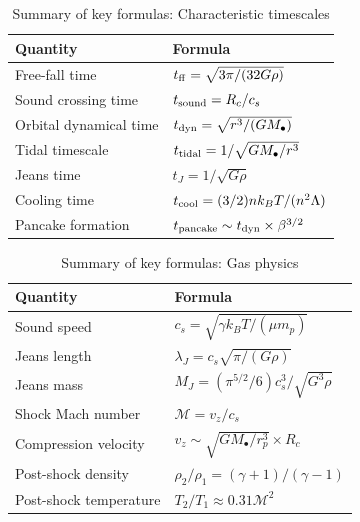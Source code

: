 \documentclass[twocolumn,amsmath,amssymb,prd,superscriptaddress,nofootinbib]{revtex4-2}
\begin{document}
\begin{table}[h]
\centering
\caption{Summary of key formulas: Characteristic timescales}
\begin{tabular}{ll}
\toprule
Quantity & Formula \\
\midrule
Free-fall time & $t_{\rm ff} = \sqrt{3\pi/(32G\rho)}$ \\
Sound crossing time & $t_{\rm sound} = R_c/c_s$ \\
Orbital dynamical time & $t_{\rm dyn} = \sqrt{r^3/(GM_\bullet)}$ \\
Tidal timescale & $t_{\rm tidal} = 1/\sqrt{GM_\bullet/r^3}$ \\
Jeans time & $t_J = 1/\sqrt{G\rho}$ \\
Cooling time & $t_{\rm cool} = (3/2)nk_BT/(n^2\Lambda)$ \\
Pancake formation & $t_{\rm pancake} \sim t_{\rm dyn} \times \beta^{3/2}$ \\
\bottomrule
\end{tabular}
\end{table}

\begin{table}[h]
\centering
\caption{Summary of key formulas: Gas physics}
\begin{tabular}{ll}
\toprule
Quantity & Formula \\
\midrule
Sound speed & $c_s = \sqrt{\gamma k_B T/(\mu m_p)}$ \\
Jeans length & $\lambda_J = c_s\sqrt{\pi/(G\rho)}$ \\
Jeans mass & $M_J = (\pi^{5/2}/6) c_s^3/\sqrt{G^3\rho}$ \\
Shock Mach number & $\mathcal{M} = v_z/c_s$ \\
Compression velocity & $v_z \sim \sqrt{GM_\bullet/r_p^3} \times R_c$ \\
Post-shock density & $\rho_2/\rho_1 = (\gamma+1)/(\gamma-1)$ \\
Post-shock temperature & $T_2/T_1 \approx 0.31\mathcal{M}^2$ \\
\bottomrule
\end{tabular}
\end{table}
\end{document}
